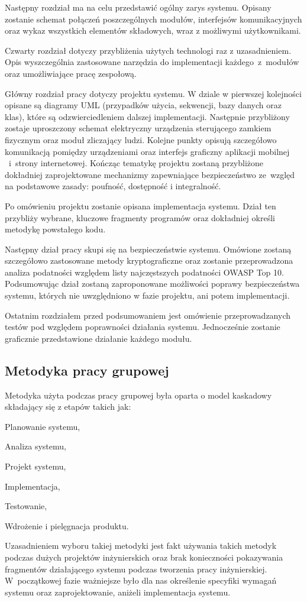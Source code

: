 Następny rozdział ma na celu przedstawić ogólny zarys systemu. Opisany zostanie schemat połączeń poszczególnych modułów, interfejsów komunikacyjnych oraz wykaz wszystkich elementów składowych, wraz z możliwymi użytkownikami.

Czwarty rozdział dotyczy przybliżenia użytych technologi raz z uzasadnieniem. Opis wyszczególnia zastosowane narzędzia do implementacji każdego~z~modułów oraz umożliwiające pracę zespołową.

Główny rozdział pracy dotyczy projektu systemu. W dziale w pierwszej kolejności opisane są diagramy UML (przypadków użycia, sekwencji, bazy danych oraz klas), które są odzwierciedleniem dalszej implementacji. Następnie przybliżony zostaje uproszczony schemat elektryczny urządzenia sterującego zamkiem fizycznym oraz moduł zliczający ludzi. Kolejne punkty opisują szczegółowo komunikacją pomiędzy urządzeniami oraz interfejs graficzny aplikacji mobilnej ~i~strony internetowej. Kończąc tematykę projektu zostaną przybliżone dokładniej zaprojektowane mechanizmy zapewniające bezpieczeństwo ze~względ na podstawowe zasady: poufność, dostępność i integralność.

Po omówieniu projektu zostanie opisana implementacja systemu. Dział ten przybliży wybrane, kluczowe fragmenty programów oraz dokładniej określi metodykę powstałego kodu. 

Następny dział pracy skupi się na bezpieczeństwie systemu. Omówione zostaną szczegółowo zastosowane metody kryptograficzne oraz zostanie przeprowadzona analiza podatności względem listy najczęstszych podatności OWASP Top 10. Podsumowując dział zostaną zaproponowane możliwości poprawy  bezpieczeństwa systemu, których nie uwzględniono w fazie projektu, ani potem implementacji.

Ostatnim rozdziałem przed podsumowaniem jest omówienie przeprowadzanych testów pod względem poprawności działania systemu. Jednocześnie zostanie graficznie przedstawione działanie każdego modułu.

\subsection{Metodyka pracy grupowej}
Metodyka użyta podczas pracy grupowej była oparta o model kaskadowy składający się z etapów takich jak:
\begin{itemize*}
	\item Planowanie systemu,
	\item Analiza systemu,
	\item Projekt systemu,
	\item Implementacja,
	\item Testowanie,
	\item Wdrożenie i pielęgnacja produktu.
\end{itemize*}

Uzasadnieniem wyboru takiej metodyki jest fakt używania takich metodyk podczas dużych projektów inżynierskich oraz brak konieczności pokazywania fragmentów działającego systemu podczas tworzenia pracy inżynierskiej. W~początkowej fazie ważniejsze było dla nas określenie specyfiki wymagań systemu oraz zaprojektowanie, aniżeli implementacja systemu.\cite{waterfall}